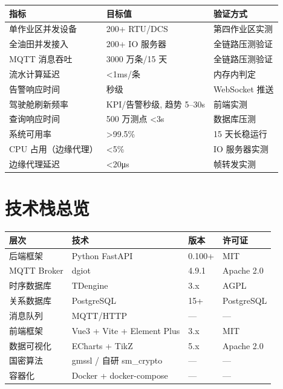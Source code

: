 \documentclass[11pt,a4paper]{ctexart}
\begin{document}
\begin{table}[H]\centering
\begin{tabular}{p{4.0cm} p{3.0cm} p{4.5cm}}
\toprule
\textbf{指标} & \textbf{目标值} & \textbf{验证方式} \\
\midrule
单作业区并发设备 & 200+ RTU/DCS & 第四作业区实测 \\
全油田并发接入 & 200+ IO 服务器 & 全链路压测验证 \\
MQTT 消息吞吐 & 3000 万条/15 天 & 全链路压测验证 \\
流水计算延迟 & <1ms/条 & 内存内判定 \\
告警响应时间 & 秒级 & WebSocket 推送 \\
驾驶舱刷新频率 & KPI/告警秒级, 趋势 5--30s & 前端实测 \\
查询响应时间 & 500 万测点 <3s & 数据库压测 \\
系统可用率 & >99.5\% & 15 天长稳运行 \\
CPU 占用（边缘代理） & <5\% & IO 服务器实测 \\
边缘代理延迟 & <20μs & 帧转发实测 \\
\bottomrule
\end{tabular}
\end{table}

\section{技术栈总览}

\begin{table}[H]\centering
\begin{tabular}{p{3.0cm} p{3.5cm} p{3.5cm} p{3.0cm}}
\toprule
\textbf{层次} & \textbf{技术} & \textbf{版本} & \textbf{许可证} \\
\midrule
后端框架 & Python FastAPI & 0.100+ & MIT \\
MQTT Broker & dgiot & 4.9.1 & Apache 2.0 \\
时序数据库 & TDengine & 3.x & AGPL \\
关系数据库 & PostgreSQL & 15+ & PostgreSQL \\
消息队列 & MQTT/HTTP & — & — \\
前端框架 & Vue3 + Vite + Element Plus & 3.x & MIT \\
数据可视化 & ECharts + TikZ & 5.x & Apache 2.0 \\
国密算法 & gmssl / 自研 sm\_crypto & — & — \\
容器化 & Docker + docker-compose & — & — \\
\bottomrule
\end{tabular}
\end{table}
\end{document}
